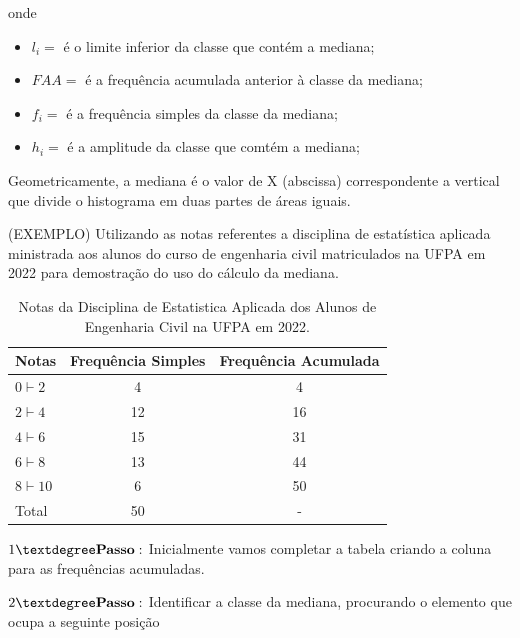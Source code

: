  onde

 \begin{itemize}
   \item $l_{i}=$ é o limite inferior da classe que contém a mediana;
   \item $FAA=$ é a frequência acumulada anterior à classe da mediana;
   \item $f_{i}=$ é a frequência simples da classe da mediana;
   \item $h_{i}=$ é a amplitude da classe que comtém a mediana;
 \end{itemize}


Geometricamente, a mediana é o valor de X (abscissa) correspondente a vertical que divide o histograma em duas partes de áreas iguais.\vskip0.3cm


(EXEMPLO) Utilizando as notas referentes a disciplina de estatística aplicada ministrada aos alunos do curso de engenharia civil matriculados na UFPA em 2022 para demostração do uso do cálculo da mediana.



  \begin{table}[!htb]
    \centering
    {
    \caption{Notas da Disciplina de Estatistica Aplicada dos Alunos de Engenharia Civil na UFPA em 2022.}
    \label{exemplomediana}
    \vspace{0.1cm}
\begin{tabular}{l|c|c}
  \hline\hline
  Notas          & Frequência Simples & Frequência Acumulada \\
  \hline\hline
  $0 \vdash 2  $ & 4          & 4                    \\
  $2 \vdash 4  $ & 12         & 16                   \\
  $4 \vdash 6  $ & 15         & 31                   \\
  $6 \vdash 8  $ & 13         & 44                   \\
  $8 \vdash 10 $ & 6          & 50                   \\
  \hline\hline
  Total & 50                  &  - \\
    \hline\hline
\end{tabular}}
\end{table}

$1° \mbox{\textbf{Passo}}:$ Inicialmente vamos completar a tabela criando a coluna para as frequências acumuladas.\vskip0.3cm

$2° \mbox{\textbf{Passo}}:$ Identificar a classe da mediana, procurando o elemento que ocupa a seguinte posição

